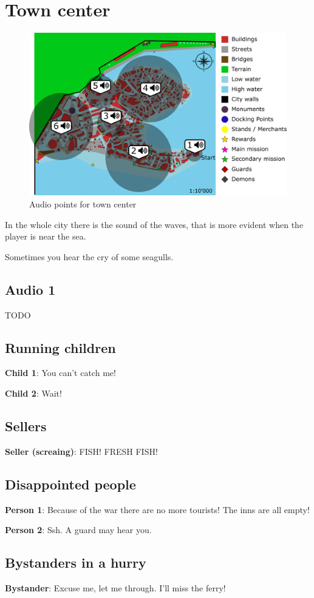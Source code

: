 \section{Town center}
\begin{figure}[H]
  \centering
  \includegraphics[width=\textwidth]{Images/Maps/dynamiaAudio}
  \caption{Audio points for town center}
\end{figure}

In the whole city there is the sound of the waves, that is more evident when the player is near the sea.

Sometimes you hear the cry of some seagulls.

\subsection{Audio 1}
TODO

\subsection{Running children}
\textbf{Child 1}: You can't catch me!

\textbf{Child 2}: Wait!

\subsection{Sellers}
\textbf{Seller (screaing)}: FISH! FRESH FISH!

\subsection{Disappointed people}
\textbf{Person 1}: Because of the war there are no more tourists! The inns are all empty!

\textbf{Person 2}: Ssh. A guard may hear you.

\subsection{Bystanders in a hurry}
\textbf{Bystander}: Excuse me, let me through. I'll miss the ferry!
